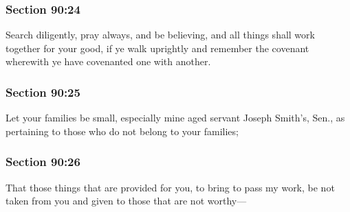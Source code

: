 	\subsubsection{Section 90:24} %
		\label{DC90-24}

		Search diligently, pray always, and be believing, and all things shall work together for your good, if ye walk uprightly and remember the covenant wherewith ye have covenanted one with another.


	\subsubsection{Section 90:25} %
		\label{DC90-25}

		Let your families be small, especially mine aged servant Joseph Smith's, Sen., as pertaining to those who do not belong to your families;


	\subsubsection{Section 90:26} %
		\label{DC90-26}

		That those things that are provided for you, to bring to pass my work, be not taken from you and given to those that are not worthy---


